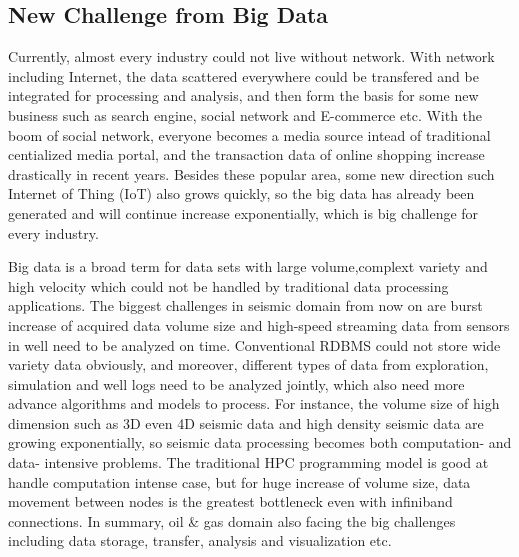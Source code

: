 \subsection{New Challenge from Big Data}
Currently, almost every industry could not live without network. With network including Internet, the data scattered everywhere could be transfered and be integrated for processing and analysis, and then form the basis for some new business such as search engine, social network and E-commerce etc. With the boom of social network, everyone becomes a media source intead of traditional centialized media portal, and the transaction data of online shopping increase drastically in recent years. Besides these popular area, some new direction such Internet of Thing (IoT) also grows quickly, so the big data has already been generated and will continue increase exponentially, which is big challenge for every industry.    

Big data\cite{WikiBigData} is a broad term for data sets with large volume,complext variety and high velocity which could not be handled by traditional data processing applications. The biggest challenges in seismic domain from now on are burst increase of acquired data volume size and high-speed streaming data from sensors in well need to be analyzed on time. Conventional RDBMS could not store wide variety data obviously, and moreover, different types of data from exploration, simulation and well logs need to be analyzed jointly, which also need more advance algorithms and models to process. For instance, the volume size of high dimension such as 3D even 4D seismic data and high density seismic data are growing exponentially, so seismic data processing becomes both computation- and data- intensive problems. The traditional HPC programming model is good at handle computation intense case, but for huge increase of volume size, data movement between nodes is the greatest bottleneck even with infiniband connections. In summary, oil \& gas domain also facing the big challenges including data storage, transfer, analysis and visualization etc.

